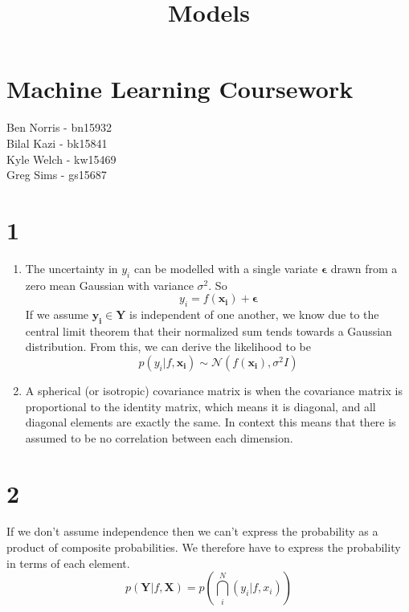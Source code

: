 \documentclass[11pt]{article}
\title{Models}
\begin{document}
    
    
    \maketitle

    \section*{Machine Learning
Coursework}\label{machine-learning-coursework}

Ben Norris - bn15932\\
Bilal Kazi - bk15841\\
Kyle Welch - kw15469\\
Greg Sims - gs15687

    \section*{1}\label{section}

\begin{enumerate}
\def\labelenumi{\alph{enumi})}
\item
  The uncertainty in \(y_i\) can be modelled with a single variate
  \(\boldsymbol{\epsilon}\) drawn from a zero mean Gaussian with
  variance \(\sigma^2\). So
  \[y_i = f(\boldsymbol{x_i}) + \boldsymbol{\epsilon}\] If we assume
  \(\boldsymbol{y_i} \in \boldsymbol{Y}\) is independent of one another,
  we know due to the central limit theorem that their normalized sum
  tends towards a Gaussian distribution. From this, we can derive the
  likelihood to be
  \[ p(y_i|f, \boldsymbol{x_i}) \sim \mathcal{N}(f(\boldsymbol{x_i}), \sigma^2I)\]
\item
  A spherical (or isotropic) covariance matrix is when the covariance
  matrix is proportional to the identity matrix, which means it is
  diagonal, and all diagonal elements are exactly the same. In context
  this means that there is assumed to be no correlation between each
  dimension.
\end{enumerate}

    \section*{2}\label{section}

If we don't assume independence then we can't express the probability as
a product of composite probabilities. We therefore have to express the
probability in terms of each element. \[
p(\mathbf{Y} | f, \mathbf{X}) = p(\bigcap_i^N (y_i | f, x_i))
\]
\end{document}
